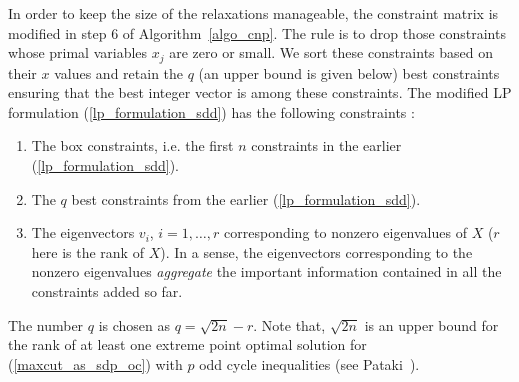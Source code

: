 \documentclass[12pt]{article}
\begin{document}
In order to keep the size of the relaxations manageable, the
constraint matrix is modified in step 6 of Algorithm~\ref{algo_cnp}. The rule is to drop those
constraints whose primal variables $x_j$ are zero or small. We
sort these constraints based on their $x$ values and retain the
$q$ (an upper bound is given below) best constraints ensuring that
the best integer vector is among these constraints. The modified
LP formulation (\ref{lp_formulation_sdd}) has the following
constraints :
\begin{enumerate}
\item The box constraints, i.e. the first $n$ constraints in the
earlier (\ref{lp_formulation_sdd}). \item The $q$ best constraints
from the earlier (\ref{lp_formulation_sdd}). \item The
eigenvectors $v_i$, $i=1,\ldots,r$ corresponding to nonzero
eigenvalues of $X$ ($r$ here is the rank of $X$). In a sense, the
eigenvectors corresponding to the nonzero eigenvalues {\em
aggregate} the important information contained in all the
constraints added so far.
\end{enumerate}
The number $q$ is chosen as $q = \sqrt{2n} - r$. Note that,
$\sqrt{2n}$ is an upper bound for the rank of at least one extreme
point optimal solution for (\ref{maxcut_as_sdp_oc}) with $p$ odd
cycle inequalities (see Pataki~\cite{pataki1}).
\end{document}
